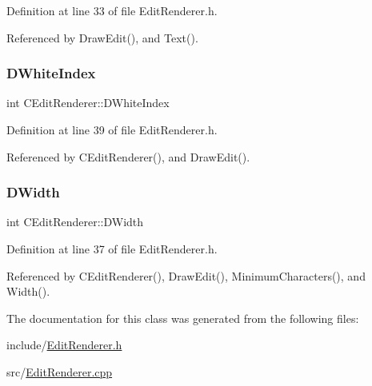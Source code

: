 Definition at line 33 of file Edit\+Renderer.\+h.



Referenced by Draw\+Edit(), and Text().

\hypertarget{classCEditRenderer_aaa97fde55438f6ad02cbb365097a2274}{}\label{classCEditRenderer_aaa97fde55438f6ad02cbb365097a2274} 
\subsubsection{\texorpdfstring{D\+White\+Index}{DWhiteIndex}}
{\footnotesize\ttfamily int C\+Edit\+Renderer\+::\+D\+White\+Index\hspace{0.3cm}{\ttfamily [protected]}}



Definition at line 39 of file Edit\+Renderer.\+h.



Referenced by C\+Edit\+Renderer(), and Draw\+Edit().

\hypertarget{classCEditRenderer_ab203e5083f61d3575eb491f170c21d45}{}\label{classCEditRenderer_ab203e5083f61d3575eb491f170c21d45} 
\subsubsection{\texorpdfstring{D\+Width}{DWidth}}
{\footnotesize\ttfamily int C\+Edit\+Renderer\+::\+D\+Width\hspace{0.3cm}{\ttfamily [protected]}}



Definition at line 37 of file Edit\+Renderer.\+h.



Referenced by C\+Edit\+Renderer(), Draw\+Edit(), Minimum\+Characters(), and Width().



The documentation for this class was generated from the following files\+:\begin{DoxyCompactItemize}
\item 
include/\hyperlink{EditRenderer_8h}{Edit\+Renderer.\+h}\item 
src/\hyperlink{EditRenderer_8cpp}{Edit\+Renderer.\+cpp}\end{DoxyCompactItemize}
